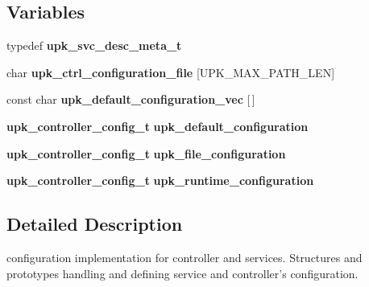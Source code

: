 \subsection*{Variables}
\begin{DoxyCompactItemize}
\item 
typedef {\bf upk\_\-svc\_\-desc\_\-meta\_\-t}
\item 
char {\bf upk\_\-ctrl\_\-configuration\_\-file} [UPK\_\-MAX\_\-PATH\_\-LEN]
\item 
const char {\bf upk\_\-default\_\-configuration\_\-vec} [$\,$]
\item 
{\bf upk\_\-controller\_\-config\_\-t} {\bf upk\_\-default\_\-configuration}
\item 
{\bf upk\_\-controller\_\-config\_\-t} {\bf upk\_\-file\_\-configuration}
\item 
{\bf upk\_\-controller\_\-config\_\-t} {\bf upk\_\-runtime\_\-configuration}
\end{DoxyCompactItemize}


\subsection{Detailed Description}
configuration implementation for controller and services. Structures and prototypes handling and defining service and controller's configuration. 